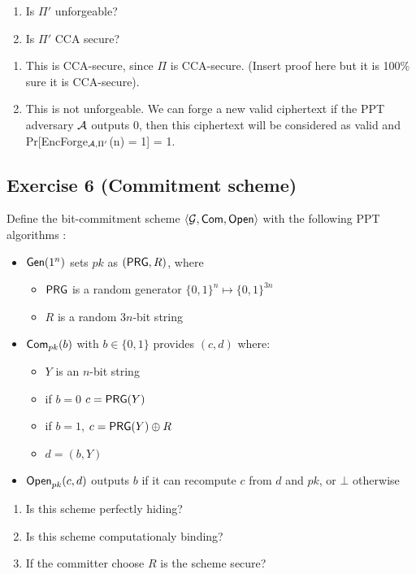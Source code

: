 \begin{enumerate}
\item Is $\Pi'$ unforgeable?
\item Is $\Pi'$ CCA secure?
\end{enumerate}
\begin{solution}
    \begin{enumerate}
        \item This is CCA-secure, since $\Pi$ is CCA-secure. (Insert proof here but it is 100\% sure it is CCA-secure).
        \item This is not unforgeable. We can forge a new valid ciphertext if the PPT adversary $\mathcal{A}$ outputs 0, then this ciphertext will be considered as valid and Pr[EncForge$_{\mathcal{A}, \Pi'}$(n) = 1] = 1.
    \end{enumerate}
\end{solution}

\subsection{Exercise 6 (Commitment scheme)}
\label{subsec:commit-scheme}
Define the bit-commitment scheme $\langle \mathcal{G}, \operatorname{\mathsf{Com}}, \operatorname{\mathsf{Open}} \rangle$ with the following PPT 
algorithms :
\begin{itemize}
\item $\operatorname{\mathsf{Gen}}(1^n)$ sets $pk$ as $(\operatorname{\mathsf{PRG}},R)$, where
  \begin{itemize}
  \item $\operatorname{\mathsf{PRG}}$ is a random generator $\lbrace 0,1 \rbrace^n \longmapsto \lbrace 0,1\rbrace^{3n}$
  \item $R$ is a random $3n$-bit string
  \end{itemize}
\item $\operatorname{\mathsf{Com}}_{pk}(b)$ with $b\in\{0,1\}$ provides $(c,d)$ where: 
  \begin{itemize}
  \item $Y$ is an $n$-bit string
  \item  if $b=0$ $c=\operatorname{\mathsf{PRG}}(Y)$
  \item if $b=1$, $c=\operatorname{\mathsf{PRG}}(Y) \oplus R$
  \item $d=(b,Y)$
  \end{itemize}
\item $\operatorname{\mathsf{Open}}_{pk}(c,d)$ outputs $b$ if it can recompute $c$ from $d$ and $pk$, or $\bot$ otherwise
\end{itemize}

\begin{enumerate}
  \item Is this scheme perfectly hiding?
	\item Is this scheme computationaly binding? 	
	\item If the committer choose $R$ is the scheme secure?
\end{enumerate}

